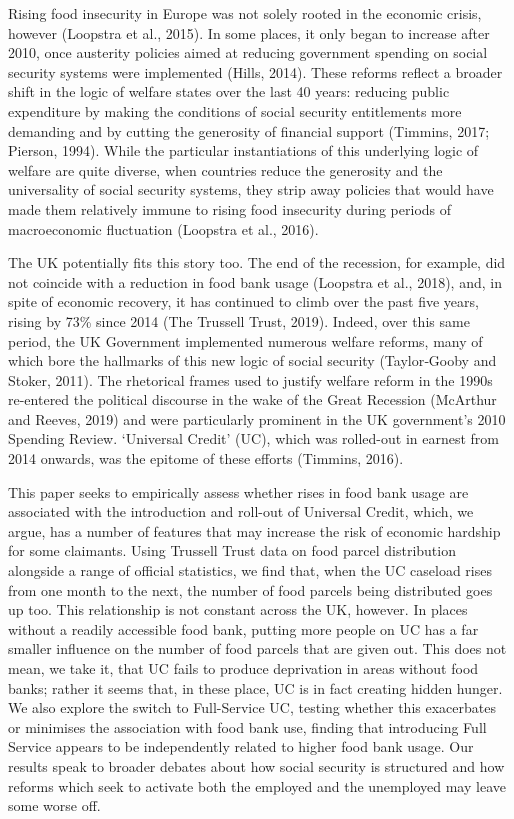\documentclass[12pt,article,oneside]{memoir}
\begin{document}
Rising food insecurity in Europe was not solely rooted in the economic crisis, however (Loopstra et al., 2015). In some places, it only began to increase after 2010, once austerity policies aimed at reducing government spending on social security systems were implemented (Hills, 2014). These reforms reflect a broader shift in the logic of welfare states over the last 40 years: reducing public expenditure by making the conditions of social security entitlements more demanding and by cutting the generosity of financial support (Timmins, 2017; Pierson, 1994). While the particular instantiations of this underlying logic of welfare are quite diverse, when countries reduce the generosity and the universality of social security systems, they strip away policies that would have made them relatively immune to rising food insecurity during periods of macroeconomic fluctuation (Loopstra et al., 2016).  

The UK potentially fits this story too. The end of the recession, for example, did not coincide with a reduction in food bank usage (Loopstra et al., 2018), and, in spite of economic recovery, it has continued to climb over the past five years, rising by 73\% since 2014 (The Trussell Trust, 2019). Indeed, over this same period, the UK Government implemented numerous welfare reforms, many of which bore the hallmarks of this new logic of social security (Taylor‐Gooby and Stoker, 2011). The rhetorical frames used to justify welfare reform in the 1990s re-entered the political discourse in the wake of the Great Recession (McArthur and Reeves, 2019) and were particularly prominent in the UK government’s 2010 Spending Review. ‘Universal Credit’ (UC), which was rolled-out in earnest from 2014 onwards, was the epitome of these efforts (Timmins, 2016).

This paper seeks to empirically assess whether rises in food bank usage are associated with the introduction and roll-out of Universal Credit, which, we argue, has a number of features that may increase the risk of economic hardship for some claimants. Using Trussell Trust data on food parcel distribution alongside a range of official statistics, we find that, when the UC caseload rises from one month to the next, the number of food parcels being distributed goes up too. This relationship is not constant across the UK, however. In places without a readily accessible food bank, putting more people on UC has a far smaller influence on the number of food parcels that are given out. This does not mean, we take it, that UC fails to produce deprivation in areas without food banks; rather it seems that, in these place, UC is in fact creating hidden hunger. We also explore the switch to Full-Service UC, testing whether this exacerbates or minimises the association with food bank use, finding that introducing Full Service appears to be independently related to higher food bank usage. Our results speak to broader debates about how social security is structured and how reforms which seek to activate both the employed and the unemployed may leave some worse off.
\end{document}
